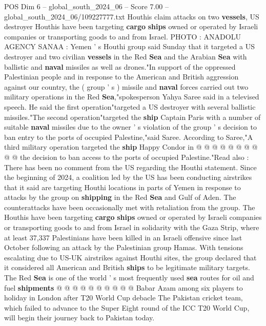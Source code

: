 \begin{textsample}{POS Dim 6 – global\_south\_2024\_06 – Score 7.00 – global\_south\_2024\_06/109227777.txt}  \label{ex:f6_pos_175}
Houthis claim attacks on two \textbf{vessels}, US destroyer Houthis have been targeting \textbf{cargo} \textbf{ships} owned or operated by Israeli companies or transporting goods to and from Israel.
PHOTO : ANADOLU AGENCY SANAA : Yemen ' s Houthi group said Sunday that it targeted a US destroyer and two civilian \textbf{vessels} in the Red \textbf{Sea} and the Arabian \textbf{Sea} with ballistic and \textbf{naval} missiles as well as drones."In support of the oppressed Palestinian people and in response to the American and British aggression against our country, the ( group ' s ) missile and \textbf{naval} forces carried out two military operations in the Red \textbf{Sea},"spokesperson Yahya Saree said in a televised speech.
He said the first operation"targeted a US destroyer with several ballistic missiles."The second operation"targeted the \textbf{ship} Captain Paris with a number of suitable \textbf{naval} missiles due to the owner ' s violation of the group ' s decision to ban entry to the ports of occupied Palestine,"said Saree.
According to Saree,"A third military operation targeted the \textbf{ship} Happy Condor in @ @ @ @ @ @ @ @ @ @ the decision to ban access to the ports of occupied Palestine."Read also : There has been no comment from the US regarding the Houthi statement.
Since the beginning of 2024, a coalition led by the US has been conducting airstrikes that it said are targeting Houthi locations in parts of Yemen in response to attacks by the group on \textbf{shipping} in the Red \textbf{Sea} and Gulf of Aden.
The counterattacks have been occasionally met with retaliation from the group.
The Houthis have been targeting \textbf{cargo} \textbf{ships} owned or operated by Israeli companies or transporting goods to and from Israel in solidarity with the Gaza Strip, where at least 37,337 Palestinians have been killed in an Israeli offensive since last October following an attack by the Palestinian group Hamas.
With tensions escalating due to US-UK airstrikes against Houthi sites, the group declared that it considered all American and British \textbf{ships} to be legitimate military targets.
The Red \textbf{Sea} is one of the world ' s most frequently used \textbf{sea} routes for oil and fuel \textbf{shipments} @ @ @ @ @ @ @ @ @ @ Babar Azam among six players to holiday in London after T20 World Cup debacle The Pakistan cricket team, which failed to advance to the Super Eight round of the ICC T20 World Cup, will begin their journey back to Pakistan today.

\end{textsample}
